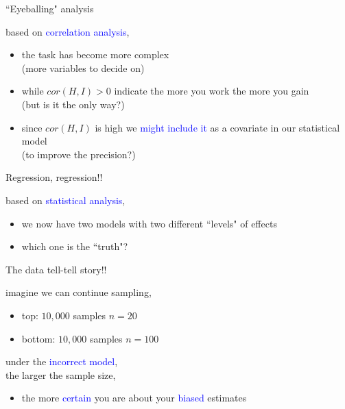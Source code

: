 %
%
\begin{lhframe}[rhgraphic={\texttt{[image: descendant2\_panel.pdf]}}]
	{``Eyeballing" analysis}
	
	based on \textcolor{blue}{correlation analysis},
	\begin{itemize}
		\item the task has become more complex \\
		{\small (more variables to decide on)}
		\item while $cor(H, I)>0$ indicate the more you work the more you gain \\
		{\small (but is it the only way?)}
		\item since $cor(H, I)$ is high we \textcolor{blue}{might include it} as a covariate in our statistical model \\
		{\small (to improve the precision?)}
	\end{itemize}
\end{lhframe}
%
%
\begin{lhframe}[rhgraphic={\texttt{[image: descendant2\_reg.png]}}]
	{Regression, regression!!}
	
	based on \textcolor{blue}{statistical analysis},
	\begin{itemize}
		\item we now have two models with two different ``levels" of effects
		\item which one is the ``truth"?
	\end{itemize}
\end{lhframe}
%
%
\begin{lhframe}[rhgraphic={\texttt{[image: descendant2\_samplesize.pdf]}}]
	{The data tell-tell story!!}
	
	imagine we can continue sampling,
	\begin{itemize}
		\item top: $10,000$ samples $n=20$
		\item bottom: $10,000$ samples $n=100$
	\end{itemize}
	
	under the \textcolor{blue}{incorrect model},\\
	the larger the sample size,
	\begin{itemize}
		\item the more \textcolor{blue}{certain} you are about your \textcolor{blue}{biased} estimates
	\end{itemize}
\end{lhframe}

